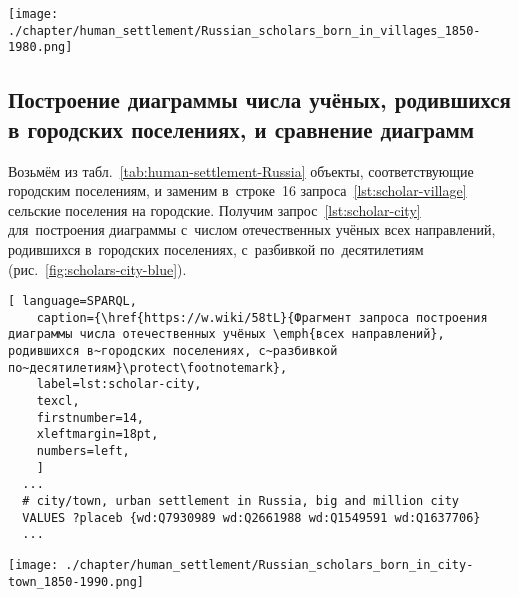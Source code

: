 \begin{figure*}
    \texttt{[image: ./chapter/human\_settlement/Russian\_scholars\_born\_in\_villages\_1850-1980.png]}%
	\label{fig:scholars-village-blue}
    \caption[Количество отечественных учёных, родившихся в сёлах, 2022 год.]
    {Количество отечественных учёных \emph{всех направлений}, 
    родившихся в~сельских поселениях с~1850-х по~1980-е годы, 2022 год}%
%
\end{figure*} 






\subsection{Построение диаграммы числа учёных, родившихся в городских поселениях, и сравнение диаграмм}

Возьмём из табл.~\ref{tab:human-settlement-Russia} объекты, соответствующие городским поселениям, 
и заменим в~строке~16 запроса~\ref{lst:scholar-village} сельские поселения на городские. 
Получим запрос~\ref{lst:scholar-city} для~построения диаграммы 
с~числом отечественных учёных всех направлений, родившихся в~городских поселениях, 
с~разбивкой по~десятилетиям (рис.~\ref{fig:scholars-city-blue}). 


\begin{lstlisting}[ language=SPARQL, 
    caption={\href{https://w.wiki/58tL}{Фрагмент запроса построения диаграммы числа отечественных учёных \emph{всех направлений}, родившихся в~городских поселениях, с~разбивкой по~десятилетиям}\protect\footnotemark},
    label=lst:scholar-city,
    texcl, 
    firstnumber=14,
    xleftmargin=18pt, 
    numbers=left,
    ]
  ...
  # city/town, urban settlement in Russia, big and million city
  VALUES ?placeb {wd:Q7930989 wd:Q2661988 wd:Q1549591 wd:Q1637706}
  ...
\end{lstlisting}%


\begin{figure*}
    \texttt{[image: ./chapter/human\_settlement/Russian\_scholars\_born\_in\_city-town\_1850-1990.png]}%
	\label{fig:scholars-city-blue}
    \caption[Количество отечественных учёных, родившихся в городах, 2022 год.]
    {Количество отечественных учёных, 
    родившихся в городских поселениях с~1850-х по~1990-е годы, 2022 год}%
%
\end{figure*} 


